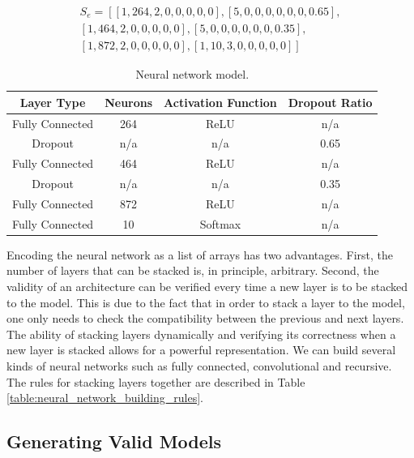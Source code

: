 \documentclass[12pt]{elsart}%
\begin{document}
\begin{align*}
S_e = \left[ \left[1, 264, 2, 0, 0, 0, 0, 0 \right], \left[5, 0, 0, 0, 0, 0, 0, 0.65 \right], \right. \\
\left. \left[1, 464, 2, 0, 0, 0, 0, 0 \right], \left[5, 0, 0, 0, 0, 0, 0, 0.35 \right], \right. \\
\left. \left[1, 872, 2, 0, 0, 0, 0, 0 \right], \left[1, 10, 3, 0, 0, 0, 0, 0 \right] \right]
\end{align*}

\begin{table}[!htb]
\begin{center}
\begin{tabular}{| c | c | c | c |}
\hline
Layer Type & Neurons & Activation Function & Dropout Ratio \\
\hline
Fully Connected & 264 & ReLU & n/a \\
Dropout & n/a & n/a & 0.65 \\
Fully Connected & 464 & ReLU & n/a\\
Dropout & n/a & n/a & 0.35\\
Fully Connected & 872 & ReLU & n/a\\
Fully Connected & 10 & Softmax & n/a\\
\hline
\end{tabular}
\end{center}
\caption{Neural network model.}
\label{table:neural_network_model}
\end{table}

Encoding the neural network as a list of arrays has two advantages. First, the number of layers that can be stacked is, in principle, arbitrary. Second, the validity of an architecture can be verified every time a new layer is to be stacked to the model. This is due to the fact that in order to stack a layer to the model, one only needs to check the compatibility between the previous and next layers. The ability of stacking layers dynamically and verifying its correctness when a new layer is stacked allows for a powerful representation. We can build several kinds of neural networks such as fully connected, convolutional and recursive. The rules for stacking layers together are described in Table \ref{table:neural_network_building_rules}.

\subsection{Generating Valid Models}
\label{sec:valid_models}
\end{document}
